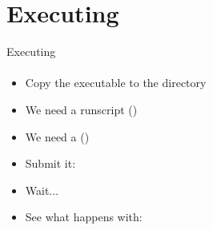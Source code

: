 \section{Executing}
\begin{frame}[<+->]{Executing}
\framesubtitle{}
\begin{itemize}
 \item Copy the executable  to the  directory
 \item We need a runscript ()
 \item We need a  ()
 \item Submit it: 
 \item Wait...
 \item See what happens with: 
\end{itemize}

\end{frame}

